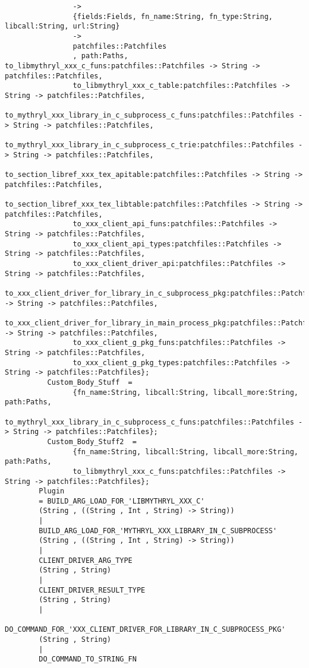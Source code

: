 \begin{verbatim}
                ->
                {fields:Fields, fn_name:String, fn_type:String, libcall:String, url:String}
                ->
                patchfiles::Patchfiles
                , path:Paths, to_libmythryl_xxx_c_funs:patchfiles::Patchfiles -> String -> patchfiles::Patchfiles,
                to_libmythryl_xxx_c_table:patchfiles::Patchfiles -> String -> patchfiles::Patchfiles,
                to_mythryl_xxx_library_in_c_subprocess_c_funs:patchfiles::Patchfiles -> String -> patchfiles::Patchfiles,
                to_mythryl_xxx_library_in_c_subprocess_c_trie:patchfiles::Patchfiles -> String -> patchfiles::Patchfiles,
                to_section_libref_xxx_tex_apitable:patchfiles::Patchfiles -> String -> patchfiles::Patchfiles,
                to_section_libref_xxx_tex_libtable:patchfiles::Patchfiles -> String -> patchfiles::Patchfiles,
                to_xxx_client_api_funs:patchfiles::Patchfiles -> String -> patchfiles::Patchfiles,
                to_xxx_client_api_types:patchfiles::Patchfiles -> String -> patchfiles::Patchfiles,
                to_xxx_client_driver_api:patchfiles::Patchfiles -> String -> patchfiles::Patchfiles,
                to_xxx_client_driver_for_library_in_c_subprocess_pkg:patchfiles::Patchfiles -> String -> patchfiles::Patchfiles,
                to_xxx_client_driver_for_library_in_main_process_pkg:patchfiles::Patchfiles -> String -> patchfiles::Patchfiles,
                to_xxx_client_g_pkg_funs:patchfiles::Patchfiles -> String -> patchfiles::Patchfiles,
                to_xxx_client_g_pkg_types:patchfiles::Patchfiles -> String -> patchfiles::Patchfiles};
          Custom_Body_Stuff  =
                {fn_name:String, libcall:String, libcall_more:String, path:Paths,
                to_mythryl_xxx_library_in_c_subprocess_c_funs:patchfiles::Patchfiles -> String -> patchfiles::Patchfiles};
          Custom_Body_Stuff2  =
                {fn_name:String, libcall:String, libcall_more:String, path:Paths,
                to_libmythryl_xxx_c_funs:patchfiles::Patchfiles -> String -> patchfiles::Patchfiles};
        Plugin
        = BUILD_ARG_LOAD_FOR_'LIBMYTHRYL_XXX_C'
        (String , ((String , Int , String) -> String))
        |
        BUILD_ARG_LOAD_FOR_'MYTHRYL_XXX_LIBRARY_IN_C_SUBPROCESS'
        (String , ((String , Int , String) -> String))
        |
        CLIENT_DRIVER_ARG_TYPE
        (String , String)
        |
        CLIENT_DRIVER_RESULT_TYPE
        (String , String)
        |
        DO_COMMAND_FOR_'XXX_CLIENT_DRIVER_FOR_LIBRARY_IN_C_SUBPROCESS_PKG'
        (String , String)
        |
        DO_COMMAND_TO_STRING_FN

\end{verbatim}
